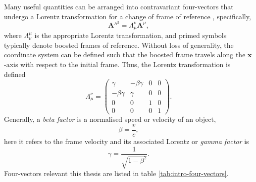 Many useful quantities can be arranged into contravariant four-vectors that undergo a Lorentz transformation for a change of frame of reference \cite{steaneRelativityMadeRelatively2012}, specifically, 
\begin{equation}
	\mathbf{A}'^\mu =\Lambda_\mu^\nu \mathbf{A}^\mu,
\end{equation}
where $\Lambda^\mu_\nu$ is the appropriate Lorentz transformation, and primed symbols typically denote boosted frames of reference. Without loss of generality, the coordinate system can be defined such that the boosted frame travels along the $\mathbf{x}$-axis with respect to the initial frame. Thus, the Lorentz transformation is defined
\begin{equation}\label{eq:zvp_lorentz}
	\Lambda_\mu^\nu = \begin{pmatrix}
		\gamma & -\beta\gamma & 0 & 0\\
		-\beta\gamma & \gamma & 0 & 0\\
		0 & 0& 1 & 0\\
		0 & 0 & 0 & 1
	\end{pmatrix}.
\end{equation}
Generally, a \textit{beta factor} is a normalised speed or velocity of an object,
\begin{equation}
	\beta = \frac{v}{c}, 
\end{equation}
here it refers to the frame velocity and its associated Lorentz or \textit{gamma factor} is
\begin{equation}
	\gamma = \frac{1}{\sqrt{1-\beta^2}}.
\end{equation}
Four-vectors relevant this thesis are listed in table \ref{tab:intro-four-vectors}.
